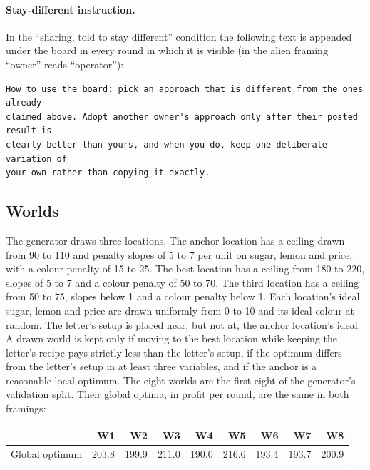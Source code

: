 \paragraph{Stay-different instruction.}
In the ``sharing, told to stay different'' condition the following text is appended under the board in every
round in which it is visible (in the alien framing ``owner'' reads ``operator''):
\begin{small}
\begin{verbatim}
How to use the board: pick an approach that is different from the ones already
claimed above. Adopt another owner's approach only after their posted result is
clearly better than yours, and when you do, keep one deliberate variation of
your own rather than copying it exactly.
\end{verbatim}
\end{small}

\subsection{Worlds}\label{app:worlds}

The generator draws three locations. The anchor location has a ceiling drawn from 90 to 110 and penalty slopes
of 5 to 7 per unit on sugar, lemon and price, with a colour penalty of 15 to 25. The best location has a ceiling
from 180 to 220, slopes of 5 to 7 and a colour penalty of 50 to 70. The third location has a ceiling from 50
to 75, slopes below 1 and a colour penalty below 1. Each location's ideal sugar, lemon and price are drawn
uniformly from 0 to 10 and its ideal colour at random. The letter's setup is placed near, but not at, the
anchor location's ideal. A drawn world is kept only if moving to the best location while keeping the letter's
recipe pays strictly less than the letter's setup, if the optimum differs from the letter's setup in at least
three variables, and if the anchor is a reasonable local optimum. The eight worlds are the first eight of the
generator's validation split. Their global optima, in profit per round, are the same in both framings:

\begin{table}[H]
  \centering
  \small
  \begin{tabular}{l rrrrrrrr}
    \toprule
    & W1 & W2 & W3 & W4 & W5 & W6 & W7 & W8 \\
    \midrule
    Global optimum & 203.8 & 199.9 & 211.0 & 190.0 & 216.6 & 193.4 & 193.7 & 200.9 \\
    \bottomrule
  \end{tabular}
\end{table}


